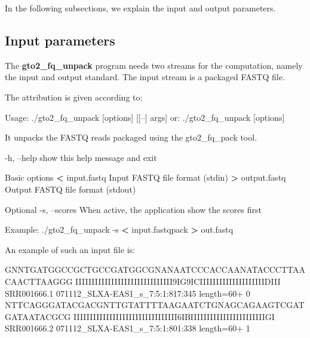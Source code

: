 \documentclass[11pt,]{krantz}
\newenvironment{Shaded}{\begin{snugshade}}{\end{snugshade}}
\newcommand{\OperatorTok}[1]{\textcolor[rgb]{0.43,0.43,0.43}{\textbf{#1}}}
\newcommand{\ExtensionTok}[1]{#1}
\newcommand{\NormalTok}[1]{#1}
\begin{document}
In the following subsections, we explain the input and output
parameters.

\subsection*{Input parameters}\label{input-parameters-13}


The \textbf{gto2\_fq\_unpack} program needs two streams for the
computation, namely the input and output standard. The input stream is a
packaged FASTQ file.

The attribution is given according to:

\begin{Shaded}
\begin{Highlighting}[]
\ExtensionTok{Usage}\NormalTok{: ./gto2_fq_unpack [options] [[--] args]}
   \ExtensionTok{or}\NormalTok{: ./gto2_fq_unpack [options]}

\ExtensionTok{It}\NormalTok{ unpacks the FASTQ reads packaged using the gto2_fq_pack }
\ExtensionTok{tool.}

    \ExtensionTok{-h}\NormalTok{, --help            show this help message and exit}

\ExtensionTok{Basic}\NormalTok{ options}
    \OperatorTok{<} \ExtensionTok{input.fastq}\NormalTok{         Input FASTQ file format (stdin)}
    \OperatorTok{>} \ExtensionTok{output.fastq}\NormalTok{        Output FASTQ file format (stdout)}

\ExtensionTok{Optional}
    \ExtensionTok{-s}\NormalTok{, --scores          When active, the application show }
                          \ExtensionTok{the}\NormalTok{ scores first}
    
\ExtensionTok{Example}\NormalTok{: ./gto2_fq_unpack -s }\OperatorTok{<}\NormalTok{ input.fastqpack }\OperatorTok{>}\NormalTok{ out.fastq}
\end{Highlighting}
\end{Shaded}

An example of such an input file is:

\begin{Shaded}
\begin{Highlighting}[]
\ExtensionTok{GNNTGATGGCCGCTGCCGATGGCGNANAATCCCACCAANATACCCTTAACAACTTAAGGG}
\ExtensionTok{IIIIIIIIIIIIIIIIIIIIIIIIIIIIII9IG9ICIIIIIIIIIIIIIIIIIIIIDIII}
\ExtensionTok{SRR001666.1}\NormalTok{ 071112_SLXA-EAS1_s_7:5:1:817:345 length=60+ 0}
\ExtensionTok{NTTCAGGGATACGACGNTTGTATTTTAAGAATCTGNAGCAGAAGTCGATGATAATACGCG}
\ExtensionTok{IIIIIIIIIIIIIIIIIIIIIIIIIIIIIIII6IBIIIIIIIIIIIIIIIIIIIIIIIGI}
\ExtensionTok{SRR001666.2}\NormalTok{ 071112_SLXA-EAS1_s_7:5:1:801:338 length=60+ 1}
\end{Highlighting}
\end{Shaded}
\end{document}
